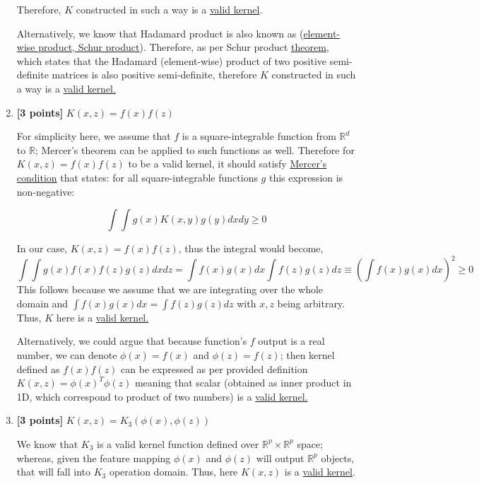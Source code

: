 \documentclass{article}
\begin{document}
\begin{enumerate}[label=\alph*)]
Therefore, $K$ constructed in such a way is a \underline{valid kernel}.

Alternatively, we know that Hadamard product is also known as (\href{https://en.wikipedia.org/wiki/Hadamard_product_(matrices)}{element-wise product, Schur product}). Therefore, as per Schur product \href{https://en.wikipedia.org/wiki/Hadamard_product_(matrices)}{theorem}, which states that the Hadamard (element-wise) product of two positive semi-definite matrices is also positive semi-definite, therefore $K$ constructed in such a way is a \underline{valid kernel.}

\item \textbf{[3 points]} $K(x, z) = f(x)f(z)$

For simplicity here, we assume that $f$ is a square-integrable function from $\mathbb{R}^d$ to $\mathbb{R}$; Mercer's theorem can be applied to such functions as well. Therefore for $K(x,z)=f(x)f(z)$ to be a valid kernel, it should satisfy \href{https://en.wikipedia.org/wiki/Mercer%27s_theorem}{Mercer's condition} that  states: for all square-integrable functions $g$ this expression is non-negative:

\[
\int\int g(x) K(x,y)g(y)dx dy \geq 0
\]

In our case, $K(x,z)=f(x)f(z)$, thus the integral would become,
\[
\int\int g(x) f(x)f(z)g(z)dx dz = \int f(x)g(x)dx\int f(z)g(z)dz \equiv \left(\int f(x)g(x)dx \right)^2 \geq 0 
\]
This follows because we assume that we are integrating over the whole domain and $\int f(x)g(x)dx = \int f(z)g(z)dz$ with $x,z$ being arbitrary.
Thus, $K$ here is a \underline{valid kernel.}

Alternatively, we could argue that because function's $f$ output is a real number, we can denote $\phi(x) = f(x)$ and $\phi(z) = f(z)$; then kernel defined as $f(x)f(z)$ can be expressed as per provided definition $K(x,z)=\phi(x)^T\phi(z)$ meaning that scalar (obtained as inner product in 1D, which correspond to product of two numbers) is a \underline{valid kernel.} 
\item \textbf{[3 points]} $K(x, z) = K_3(\phi(x), \phi (z))$

We know that $K_3$ is a valid kernel function defined over $\mathbb{R}^p \times \mathbb{R}^p$ space; whereas, given the feature mapping $\phi(x)$ and $\phi(z)$ will output  $\mathbb{R}^p$ objects, that  will fall into $K_3$ operation domain. Thus, here $K(x,z)$ is  a \underline{valid kernel}.




\end{enumerate}
\end{document}
